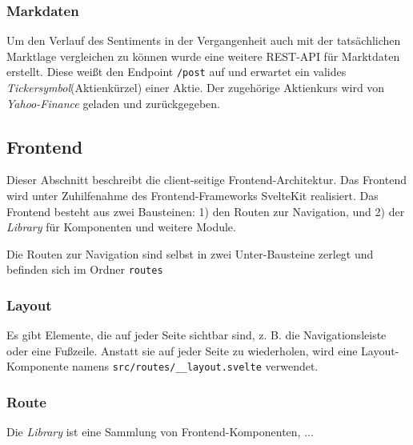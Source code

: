 \documentclass[a4paper, 10pt, conference]{IEEEtran}
\begin{document}
\subsubsection{Markdaten}

Um den Verlauf des Sentiments in der Vergangenheit auch mit der tatsächlichen Marktlage vergleichen zu können wurde eine weitere REST-API für Marktdaten erstellt. Diese weißt den Endpoint \texttt{/post} auf und erwartet ein valides \textit{Tickersymbol}(Aktienkürzel) einer Aktie. Der zugehörige Aktienkurs wird von \textit{Yahoo-Finance} geladen und zurückgegeben. 

\subsection{Frontend} \label{sub:frontend}
Dieser Abschnitt beschreibt die client-seitige Frontend-Architektur. Das Frontend wird unter Zuhilfenahme des Frontend-Frameworks SvelteKit \cite{sveltekit} realisiert. Das Frontend besteht aus zwei Bausteinen: 1) den Routen zur Navigation, und 2) der \textit{Library} für Komponenten und weitere Module.

Die Routen zur Navigation sind selbst in zwei Unter-Bausteine zerlegt und befinden sich im Ordner \texttt{routes}

\subsubsection{Layout}

Es gibt Elemente, die auf jeder Seite sichtbar sind, z. B. die Navigationsleiste oder eine Fußzeile. Anstatt sie auf jeder Seite zu wiederholen,  wird eine Layout-Komponente namens \texttt{src/routes/\_\_layout.svelte} verwendet.

\subsubsection{Route}


Die \textit{Library} ist eine Sammlung von Frontend-Komponenten,  ...
\end{document}
